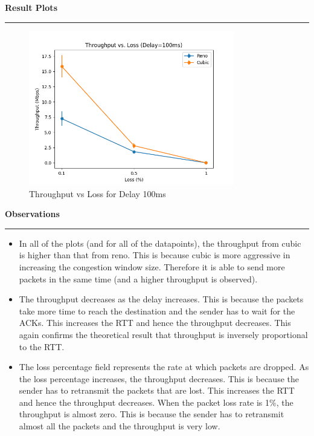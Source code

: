 \documentclass[a4paper,12pt]{article}
\newenvironment{solution}[2][]{%
    \begin{mdframed}[linecolor=blue!70!black, linewidth=2pt, roundcorner=10pt, backgroundcolor=yellow!10!white, skipabove=12pt, skipbelow=12pt]%
        \textbf{\large #2}
        \par\noindent\rule{\textwidth}{0.4pt}
}{
    \end{mdframed}
}
\begin{document}
\begin{solution}{Result Plots}
    \begin{figure}[H]
        \centering
        \includegraphics[width=0.8\textwidth]{throughput_vs_loss_delay_100ms.png}
        \caption{Throughput vs Loss for Delay 100ms}
    \end{figure}
\end{solution}

\begin{solution}{Observations}
    \begin{itemize}
        \item In all of the plots (and for all of the datapoints), the throughput from cubic is higher than that from reno. This is because cubic is more aggressive in increasing the congestion window size. Therefore it is able to send more packets in the same time (and a higher throughput is observed).
        \item The throughput decreases as the delay increases. This is because the packets take more time to reach the destination and the sender has to wait for the ACKs. This increases the RTT and hence the throughput decreases. This again confirms the theoretical result that throughput is inversely proportional to the RTT.
        \item The loss percentage field represents the rate at which packets are dropped. As the loss percentage increases, the throughput decreases. This is because the sender has to retransmit the packets that are lost. This increases the RTT and hence the throughput decreases. When the packet loss rate is 1\%, the throughput is almost zero. This is because the sender has to retransmit almost all the packets and the throughput is very low.
    \end{itemize}
\end{solution}
\end{document}
